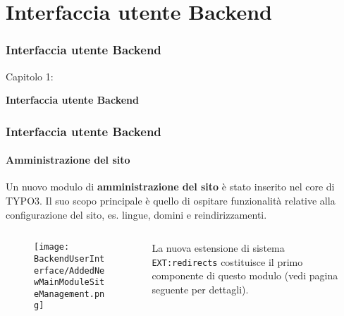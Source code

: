%

\section{Interfaccia utente Backend}
\begin{frame}[fragile]
	\frametitle{Interfaccia utente Backend}

	\begin{center}\huge{Capitolo 1:}\end{center}
	\begin{center}\huge{\color{typo3darkgrey}\textbf{Interfaccia utente Backend}}\end{center}

\end{frame}


\begin{frame}[fragile]
	\frametitle{Interfaccia utente Backend}
	\framesubtitle{Amministrazione del sito}

	Un nuovo modulo di \textbf{amministrazione del sito} è stato inserito nel core di TYPO3.
	Il suo scopo principale è quello di ospitare funzionalità relative alla configurazione del sito,
	es. lingue, domini e reindirizzamenti.

	\begin{columns}[T]
		\begin{column}{.4\textwidth}
			\begin{figure}\vspace*{-0.4cm}
				\texttt{[image: BackendUserInterface/AddedNewMainModuleSiteManagement.png]}
			\end{figure}
		\end{column}
		\begin{column}{.5\textwidth}
			La nuova estensione di sistema \texttt{EXT:redirects} costituisce il primo componente 
			di questo modulo (vedi pagina seguente per dettagli).
		\end{column}
		\begin{column}{.1\textwidth}
		\end{column}
	\end{columns}

\end{frame}

